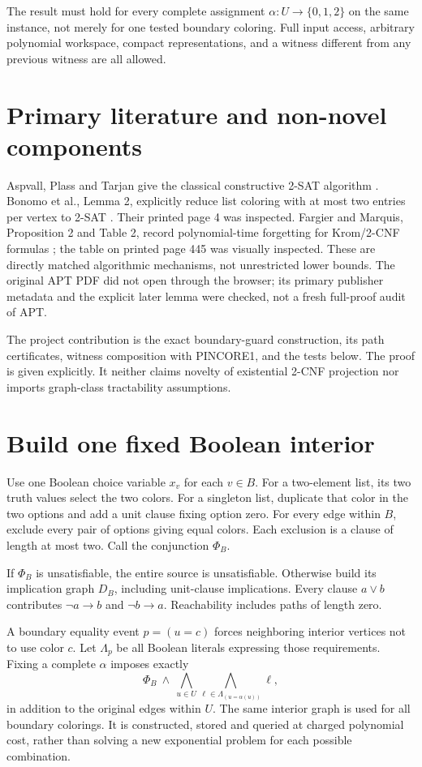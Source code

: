 \documentclass[11pt]{article}
\newcommand{\COL}{\{0,1,2\}}
\begin{document}
The result must hold for every complete assignment $\alpha:U\to\COL$ on
the same instance, not merely for one tested boundary coloring. Full input
access, arbitrary polynomial workspace, compact representations, and a
witness different from any previous witness are all allowed.

\section{Primary literature and non-novel components}
Aspvall, Plass and Tarjan give the classical constructive 2-SAT algorithm
\cite{apt}. Bonomo et al., Lemma 2, explicitly reduce list coloring with
at most two entries per vertex to 2-SAT \cite{bonomo}. Their printed page 4
was inspected. Fargier and Marquis, Proposition 2 and Table 2, record
polynomial-time forgetting for Krom/2-CNF formulas \cite{fm}; the table on
printed page 445 was visually inspected. These are directly matched
algorithmic mechanisms, not unrestricted lower bounds. The original APT
PDF did not open through the browser; its primary publisher metadata and
the explicit later lemma were checked, not a fresh full-proof audit of APT.

The project contribution is the exact boundary-guard construction, its
path certificates, witness composition with PINCORE1, and the tests below.
The proof is given explicitly. It neither claims novelty of existential
2-CNF projection nor imports graph-class tractability assumptions.

\section{Build one fixed Boolean interior}
Use one Boolean choice variable $x_v$ for each $v\in B$.
For a two-element list, its two truth values select the two colors.
For a singleton list, duplicate that color in the two options and add a
unit clause fixing option zero. For every edge within $B$, exclude every
pair of options giving equal colors. Each exclusion is a clause of length
at most two. Call the conjunction $\Phi_B$.

If $\Phi_B$ is unsatisfiable, the entire source is unsatisfiable. Otherwise
build its implication graph $D_B$, including unit-clause implications.
Every clause $a\lor b$ contributes $\neg a\to b$ and $\neg b\to a$.
Reachability includes paths of length zero.

A boundary equality event $p=(u=c)$ forces neighboring interior vertices not
to use color $c$. Let $\Lambda_p$ be all Boolean literals expressing those
requirements. Fixing a complete $\alpha$ imposes exactly
\[
 \Phi_B\ \land\ \bigwedge_{u\in U}\bigwedge_{\ell\in\Lambda_{(u=\alpha(u))}}\ell,
\]
in addition to the original edges within $U$. The same interior graph is
used for all boundary colorings. It is constructed, stored and queried at
charged polynomial cost, rather than solving a new exponential problem for
each possible combination.
\end{document}
